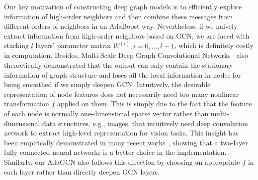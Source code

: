 \documentclass{article} \usepackage{iclr2021_conference,times}
\begin{document}
Our key motivation of constructing deep graph models is to efficiently explore information of high-order neighbors and then combine these messages from different orders of neighbors in an AdaBoost way. Nevertheless, if we naively extract information from high-order neighbors based on GCN, we are faced with stacking $l$ layers' parameter matrix $W^{(i)}, i=0,...,l-1$, which is definitely costly in computation. Besides, Multi-Scale Deep Graph Convolutional Networks~\citep{luan2019break} also theoretically demonstrated that the output can only contain the stationary information of graph structure and loses all the local information in nodes for being smoothed if we simply deepen GCN. Intuitively, the desirable representation of node features does not necessarily need too many nonlinear transformation $f$ applied on them. This is simply due to the fact that the feature of each node is normally one-dimensional sparse vector rather than multi-dimensional data structures, e.g., images, that intuitively need deep convolution network to extract high-level representation for vision tasks. This insight has been empirically demonstrated in many recent works~\citep{wu2019simplifying, klicpera2018predict, xu2018powerful}, showing that a two-layer fully-connected neural networks is a better choice in the implementation. Similarly, our AdaGCN also follows this direction by choosing an appropriate $f$ in each layer rather than directly deepen GCN layers.
\end{document}
